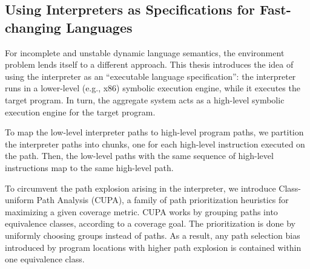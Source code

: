 \subsection{Using Interpreters as Specifications for Fast-changing Languages}



For incomplete and unstable dynamic language semantics, the environment problem lends itself to a different approach.
%
This thesis introduces the idea of using the interpreter as an ``executable language specification'': the interpreter runs in a lower-level (e.g., x86) symbolic execution engine, while it executes the target program.  In turn, the aggregate system acts as a high-level symbolic execution engine for the target program.


To map the low-level interpreter paths to high-level program paths, we partition the interpreter paths into chunks, one for each high-level instruction executed on the path. Then, the low-level paths with the same sequence of high-level instructions map to the same high-level path.

To circumvent the path explosion arising in the interpreter, we introduce Class-uniform Path Analysis (CUPA), a family of path prioritization heuristics for maximizing a given coverage metric.
%
CUPA works by grouping paths into equivalence classes, according to a coverage goal.  The prioritization is done by uniformly choosing groups instead of paths.  As a result, any path selection bias introduced by program locations with higher path explosion is contained within one equivalence class.


